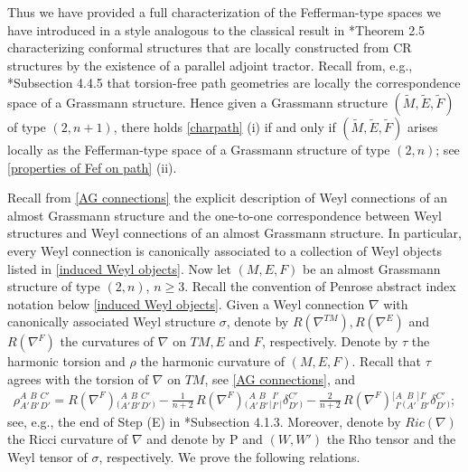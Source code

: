 \documentclass[11pt]{amsart}
\begin{document}
Thus we have provided a full characterization of the Fefferman-type spaces we have introduced in a style analogous to the classical result in \cite{CG06}*{Theorem 2.5} characterizing conformal structures that are locally constructed from CR structures by the existence of a parallel adjoint tractor. Recall from, e.g., \cite{Book}*{Subsection 4.4.5} that torsion-free path geometries are locally the correspondence space of a Grassmann structure. Hence given a Grassmann structure $(\tilde M,\tilde E,\tilde F)$ of type $(2,n+1)$, there holds \cref{charpath} (i) if and only if $(\tilde M,\tilde E,\tilde F)$ arises locally as the Fefferman-type space of a Grassmann structure of type $(2,n)$; see \cref{properties of Fef on path} (ii).

Recall from \cref{AG connections} the explicit description of Weyl connections of an almost Grassmann structure and the one-to-one correspondence between Weyl structures and Weyl connections of an almost Grassmann structure. In particular, every Weyl connection is canonically associated to a collection of Weyl objects listed in  \eqref{induced Weyl objects}. Now let $(M,E,F)$ be an almost Grassmann structure of type $(2,n)$, $n\geq 3$. Recall the convention of Penrose abstract index notation below \eqref{induced Weyl objects}. Given a Weyl connection $\nabla$ with canonically associated Weyl structure $\sigma$, denote by $R(\nabla^{TM}),R(\nabla^E)$ and $R(\nabla^F)$ the curvatures of $\nabla$ on $TM,E$ and $F$, respectively. Denote by $\tau$ the harmonic torsion and $\rho$ the harmonic curvature of $(M,E,F)$. Recall that $\tau$ agrees with the torsion of $\nabla$ on $TM$, see \cref{AG connections}, and
\begin{align*}
\rho{}^A_{A'}{}^B_{B'}{}^{C'}_{D'}=R(\nabla^F){}_{(}{}^A_{A'}{}^B_{B'}{}^{C'}_{D'}{}_{)}-\frac{1}{n+2}\,R(\nabla^F){}_{(}{}^A_{A'}{}^B_{B'}{}_{|}{}^{I'}_{I'}{}_{|}\delta{}^{C'}_{D'}{}_{)}
-\frac{2}{n+2}\,R(\nabla^F){}^{[}{}^{A}_{I'}{}_{(}{}^{B}_{A'}{}^{]}
{}^{I'}_{B'}\delta{}^{C'}_{D'}{}_{)};
\end{align*}
see, e.g., the end of Step (E) in \cite{Book}*{Subsection 4.1.3}. Moreover, denote by $Ric(\nabla)$ the Ricci curvature of $\nabla$ and denote by $\mathrm{P}$ and $(W,W')$ the Rho tensor and the Weyl tensor of $\sigma$, respectively. We prove the following relations.
\end{document}
